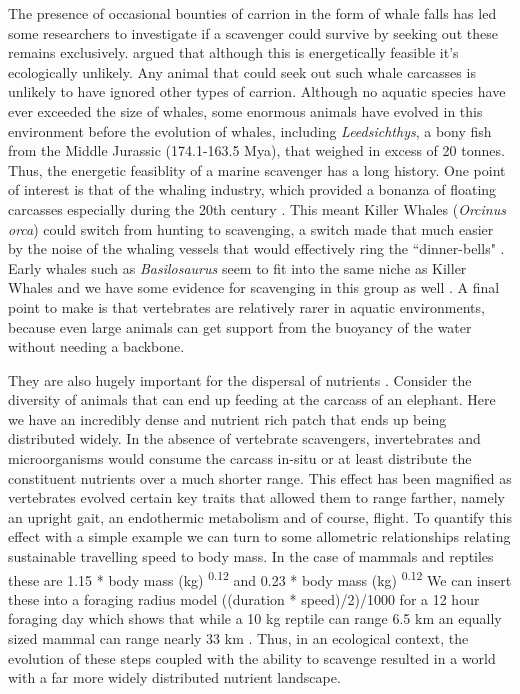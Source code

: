 \documentclass[a4paper,12pt]{article}
\begin{document}
The presence of occasional bounties of carrion in the form of whale falls has led some researchers to investigate if a scavenger could survive by seeking out these remains exclusively.
\cite{ruxton2005searching} argued that although this is energetically feasible it's ecologically unlikely.
Any animal that could seek out such whale carcasses is unlikely to have ignored other types of carrion.
Although no aquatic species have ever exceeded the size of whales, some enormous animals have evolved in this environment before the evolution of whales, including \textit{Leedsichthys}, a bony fish from the Middle Jurassic (174.1-163.5 Mya), that weighed in excess of 20 tonnes.
Thus, the energetic feasiblity of a marine scavenger has a long history.
One point of interest is that of the whaling industry, which provided a bonanza of floating carcasses especially during the 20th century \citep{Whitehead415}.
This meant Killer Whales (\textit{Orcinus orca}) could switch from hunting to scavenging, a switch made that much easier by the noise of the whaling vessels that would effectively ring the ``dinner-bells" \citep{Whitehead415}.
Early whales such as \textit{Basilosaurus} seem to fit into the same niche as Killer Whales and we have some evidence for scavenging in this group as well \citep{fahlke2012bite}.
A final point to make is that vertebrates are relatively rarer in aquatic environments, because even large animals can get support from the buoyancy of the water without needing a backbone.

They are also hugely important for the dispersal of nutrients \citep{beasley2015vertebrates}.
Consider the diversity of animals that can end up feeding at the carcass of an elephant.
Here we have an incredibly dense and nutrient rich patch that ends up being distributed widely.
In the absence of vertebrate scavengers, invertebrates and microorganisms would consume the carcass in-situ or at least distribute the constituent nutrients over a much shorter range.
This effect has been magnified as vertebrates evolved certain key traits that allowed them to range farther, namely an upright gait, an endothermic metabolism and of course, flight.
To quantify this effect with a simple example we can turn to some allometric relationships relating sustainable travelling speed to body mass.
In the case of mammals and reptiles these are 1.15 * body mass (kg) \textsuperscript{0.12} and 0.23 * body mass (kg) \textsuperscript{0.12}
We can insert these into a foraging radius model ((duration * speed)/2)/1000 for a 12 hour foraging day which shows that while a 10 kg reptile can range 6.5 km an equally sized mammal can range nearly 33 km \citep{Enstipp2006Energetics}.
Thus, in an ecological context, the evolution of these steps coupled with the ability to scavenge resulted in a world with a far more widely distributed nutrient landscape.
\end{document}
